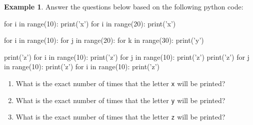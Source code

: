 \documentclass[10pt]{article}
\theoremstyle{definition}
\newtheorem{example}{Example}
\begin{document}
\newpage
\begin{example}
Answer the questions below based on the following python code:
\begin{python}
for i in range(10):
    print('x')
for i in range(20):
    print('x')

for i in range(10):
    for j in range(20):
        for k in range(30):
            print('y')

print('z')
for i in range(10):
    print('z')
    for j in range(10):
        print('z')
        print('z')
    for j in range(10):
        print('z')
for i in range(10):
    print('z')
\end{python}
    \begin{enumerate}
        \item What is the exact number of times that the letter \texttt{x} will be printed?
            \vspace{1.5in}
        \item What is the exact number of times that the letter \texttt{y} will be printed?
            \vspace{1.5in}
        \item What is the exact number of times that the letter \texttt{z} will be printed?
    \end{enumerate}
\end{example}
\end{document}
